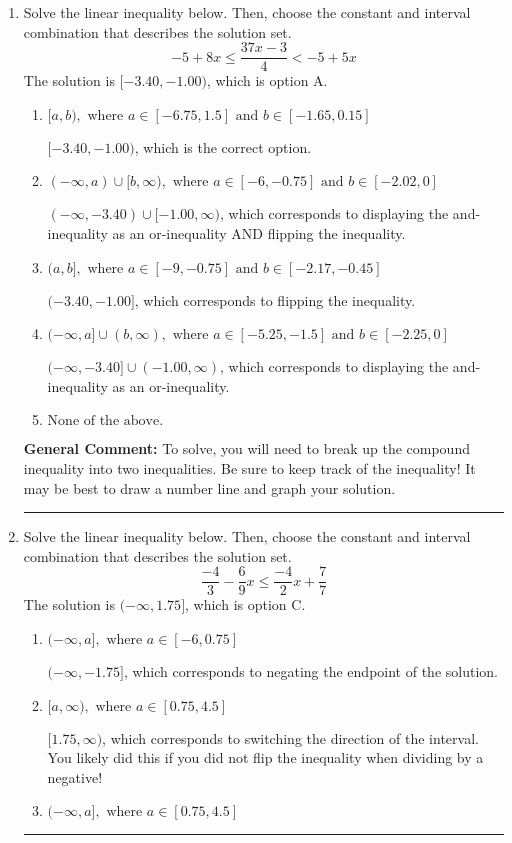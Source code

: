 \documentclass{extbook}[14pt]
\newcommand{\litem}[1]{\item #1

\rule{\textwidth}{0.4pt}}
\begin{document}
\begin{enumerate}\litem{
Solve the linear inequality below. Then, choose the constant and interval combination that describes the solution set.
\[ -5 + 8 x \leq \frac{37 x - 3}{4} < -5 + 5 x \]The solution is \( [-3.40, -1.00) \), which is option A.\begin{enumerate}[label=\Alph*.]
\item \( [a, b), \text{ where } a \in [-6.75, 1.5] \text{ and } b \in [-1.65, 0.15] \)

$[-3.40, -1.00)$, which is the correct option.
\item \( (-\infty, a) \cup [b, \infty), \text{ where } a \in [-6, -0.75] \text{ and } b \in [-2.02, 0] \)

$(-\infty, -3.40) \cup [-1.00, \infty)$, which corresponds to displaying the and-inequality as an or-inequality AND flipping the inequality.
\item \( (a, b], \text{ where } a \in [-9, -0.75] \text{ and } b \in [-2.17, -0.45] \)

$(-3.40, -1.00]$, which corresponds to flipping the inequality.
\item \( (-\infty, a] \cup (b, \infty), \text{ where } a \in [-5.25, -1.5] \text{ and } b \in [-2.25, 0] \)

$(-\infty, -3.40] \cup (-1.00, \infty)$, which corresponds to displaying the and-inequality as an or-inequality.
\item \( \text{None of the above.} \)


\end{enumerate}

\textbf{General Comment:} To solve, you will need to break up the compound inequality into two inequalities. Be sure to keep track of the inequality! It may be best to draw a number line and graph your solution.
}
\litem{
Solve the linear inequality below. Then, choose the constant and interval combination that describes the solution set.
\[ \frac{-4}{3} - \frac{6}{9} x \leq \frac{-4}{2} x + \frac{7}{7} \]The solution is \( (-\infty, 1.75] \), which is option C.\begin{enumerate}[label=\Alph*.]
\item \( (-\infty, a], \text{ where } a \in [-6, 0.75] \)

 $(-\infty, -1.75]$, which corresponds to negating the endpoint of the solution.
\item \( [a, \infty), \text{ where } a \in [0.75, 4.5] \)

 $[1.75, \infty)$, which corresponds to switching the direction of the interval. You likely did this if you did not flip the inequality when dividing by a negative!
\item \( (-\infty, a], \text{ where } a \in [0.75, 4.5] \)


\end{enumerate}}
\end{enumerate}
\end{document}
